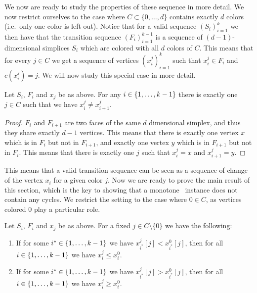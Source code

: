 We now are ready to study the properties of these sequence in more detail. We now restrict ourselves to the case where $C \subset \{0, \dots, d\}$ contains exactly $d$ colors (i.e.~only one color is left out). Notice that for a valid sequence $\left( S_i \right)_{i=1}^k$ we then have that the transition sequence $\left( F_i \right)_{i=1}^{k-1}$ is a sequence of $(d-1)$-dimensional simplices $S_i$ which are colored with all $d$ colors of $C$. This means that for every $j \in C$ we get a sequence of vertices $(x_i^j)_{i=1}^k$ such that $x_i^j \in F_i$ and $c(x_i^j) = j$. We will now study this special case in more detail.

\begin{lemma}
    Let $S_i$, $F_i$ and $x_j$ be as above. For any $i \in \left\{1, \dots, k-1\right\}$ there is exactly one $j \in C$ such that we have $x_i^j \neq x_{i+1}^j$.
\end{lemma}
\begin{proof}
    $F_i$ and $F_{i+1}$ are two faces of the same $d$ dimensional simplex, and thus they share exactly $d-1$ vertices. This means that there is exactly one vertex $x$ which is in $F_i$ but not in $F_{i+1}$, and exactly one vertex $y$ which is in $F_{i+1}$ but not in $F_i$. This means that there is exactly one $j$ such that $x_i^j = x$ and $x_{i+1}^j = y$.
\end{proof}
This means that a valid transition sequence can be seen as a sequence of change of the vertex $x_i$ for a given color $j$. Now we are ready to prove the main result of this section, which is the key to showing that a monotone \Tarski\ instance does not contain any cycles. We restrict the setting to the case where $0 \in C$, as vertices colored $0$ play a particular role.
\begin{proposition}
    Let $S_i$, $F_i$ and $x_j$ be as above. For a fixed $j \in C \setminus \{0\}$ we have the following:
    \begin{enumerate}
        \item If for some $i^* \in \left\{1, \dots, k-1\right\}$ we have $x_{i^*}^j[j] < x_{i^*}^0[j]$, then for all $i \in \left\{1, \dots, k-1\right\}$ we have $x_i^j\leq x_i^0$.
        \item If for some $i^* \in \left\{1, \dots, k-1\right\}$ we have $x_{i^*}^j[j] > x_{i^*}^0[j]$, then for all $i \in \left\{1, \dots, k-1\right\}$ we have $x_i^j\geq x_i^0$.
    \end{enumerate}
\end{proposition}